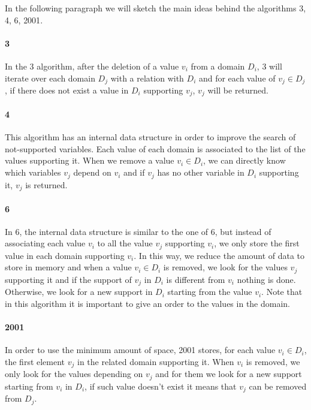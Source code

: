 \documentclass{rapport}
\begin{document}
In the following paragraph we will sketch the main ideas behind the algorithms \ac{3}, \ac{4}, \ac{6}, \ac{2001}.

\paragraph{\ac{3}}

In the \ac{3} algorithm, after the deletion of a value $v_i$ from a domain $D_i$, \ac{3} will iterate over each domain $D_j$ with a relation with $D_i$ and for each value of $v_j \in D_j$, if there does not exist a value in $D_i$ supporting $v_j$, $v_j$ will be returned.

\paragraph{\ac{4}}

This algorithm has an internal data structure in order to improve the search of not-supported variables. Each value of each domain is associated to the list of the values supporting it. When we remove a value $v_i \in D_i$, we can directly know which variables $v_j$ depend on $v_i$ and if $v_j$ has no other variable in $D_i$ supporting it, $v_j$ is returned.

\paragraph{\ac{6}}

In \ac{6}, the internal data structure is similar to the one of \ac{6}, but instead of associating each value $v_i$ to all the value $v_j$ supporting $v_i$, we only store the first value in each domain supporting $v_i$. In this way, we reduce the amount of data to store in memory and when a value $v_i \in D_i$ is removed, we look for the values $v_j$ supporting it and if the support of $v_j$ in $D_i$ is different from $v_i$ nothing is done. Otherwise, we look for a new support in $D_i$ starting from the value $v_i$. Note that in this algorithm it is important to give an order to the values in the domain.

\paragraph{\ac{2001}}

In order to use the minimum amount of space, \ac{2001} stores, for each value $v_i \in D_i$, the first element $v_j$ in the related domain supporting it. When $v_i$ is removed, we only look for the values depending on $v_j$ and for them we look for a new support starting from $v_i$ in $D_i$, if such value doesn't exist it means that $v_j$ can be removed from $D_j$.
\end{document}
